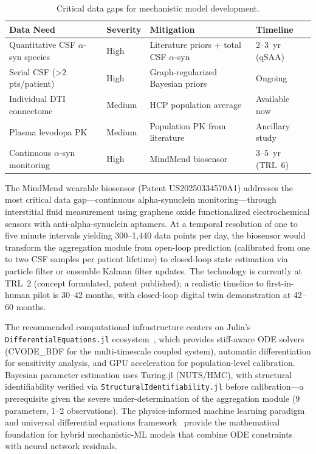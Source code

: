 \begin{table}[t]
\centering
\caption{Critical data gaps for mechanistic model development.}
\label{tab:data-gaps-ch9}
\small
\begin{tabular}{p{3.2cm}lp{3.5cm}l}
\toprule
\textbf{Data Need} & \textbf{Severity} & \textbf{Mitigation} & \textbf{Timeline} \\
\midrule
Quantitative CSF $\alpha$-syn species & High & Literature priors + total CSF $\alpha$-syn & 2--3~yr (qSAA) \\
Serial CSF (>2 pts/patient) & High & Graph-regularized Bayesian priors & Ongoing \\
Individual DTI connectome & Medium & HCP population average & Available now \\
Plasma levodopa PK & Medium & Population PK from literature & Ancillary study \\
Continuous $\alpha$-syn monitoring & High & MindMend biosensor & 3--5~yr (TRL~6) \\
\bottomrule
\end{tabular}
\end{table}

The MindMend wearable biosensor (Patent US20250334570A1) addresses the most critical data gap---continuous alpha-synuclein monitoring---through interstitial fluid measurement using graphene oxide functionalized electrochemical sensors with anti-alpha-synuclein aptamers. At a temporal resolution of one to five minute intervals yielding 300--1,440 data points per day, the biosensor would transform the aggregation module from open-loop prediction (calibrated from one to two CSF samples per patient lifetime) to closed-loop state estimation via particle filter or ensemble Kalman filter updates. The technology is currently at TRL~2 (concept formulated, patent published); a realistic timeline to first-in-human pilot is 30--42 months, with closed-loop digital twin demonstration at 42--60 months.

The recommended computational infrastructure centers on Julia's \texttt{DifferentialEquations.jl} ecosystem~\cite{rackauckas2017,rackauckas2020}, which provides stiff-aware ODE solvers (CVODE\_BDF for the multi-timescale coupled system), automatic differentiation for sensitivity analysis, and GPU acceleration for population-level calibration. Bayesian parameter estimation uses Turing.jl (NUTS/HMC), with structural identifiability verified via \texttt{StructuralIdentifiability.jl} before calibration---a prerequisite given the severe under-determination of the aggregation module (9 parameters, 1--2 observations). The physics-informed machine learning paradigm~\cite{karniadakis2021} and universal differential equations framework~\cite{rackauckas2020} provide the mathematical foundation for hybrid mechanistic-ML models that combine ODE constraints with neural network residuals.

